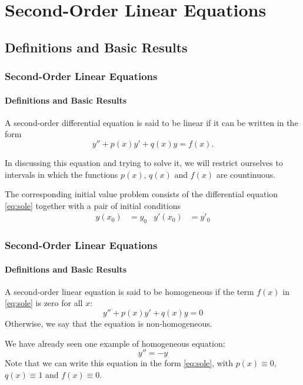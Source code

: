 \documentclass[9pt,xcolor=x11names,compress]{beamer}
\begin{document}
\section{Second-Order Linear Equations}
\subsection{Definitions and Basic Results}

\begin{frame}\frametitle{Second-Order Linear Equations}
\framesubtitle{Definitions and Basic Results}
\begin{definition}
A second-order differential equation is said to be \alert{linear} if it can be written in the form
\begin{equation}\label{eq:sole}
	y''+p(x)y'+q(x)y=f(x).
\end{equation}
\end{definition}
\pause In discussing this equation and trying to solve it, we will restrict ourselves to intervals in which the functions $p(x)$, $q(x)$ and $f(x)$ are countinuous.
\pause 
\begin{definition}
	The corresponding \alert{initial value problem} consists of the differential equation \eqref{eq:sole} together with a pair of initial conditions
	\begin{align*}
		y(x_0)&=y_0 &y'(x_0)&=y'_0
	\end{align*}
\end{definition}
\end{frame}

\begin{frame}\frametitle{Second-Order Linear Equations}
\framesubtitle{Definitions and Basic Results}
\begin{definition}
	A second-order linear equation is said to be \alert{homogeneous} if the term $f(x)$ in \eqref{eq:sole} is zero for all $x$:
	\begin{equation*}
		y''+p(x)y'+q(x)y=0
	\end{equation*}
	Otherwise, we say that the equation is \alert{non-homogeneous}.
\end{definition}
\pause We have already seen one example of homogeneous equation:
\begin{equation*}
	y''=-y
\end{equation*}
Note that we can write this equation in the form \eqref{eq:sole}, with $p(x)\equiv 0$, $q(x)\equiv 1$ and $f(x)\equiv 0$.

\vspace{2cm}
\end{frame}
\end{document}
